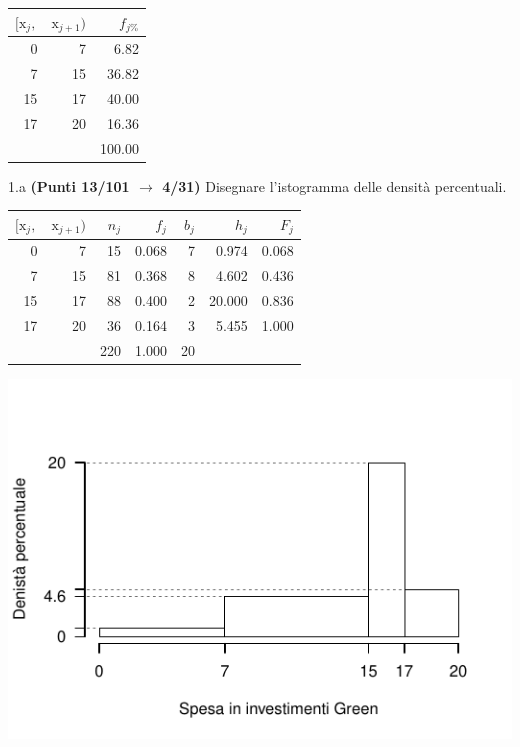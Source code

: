 \documentclass[
  11pt,
]{book}
\theoremstyle{mytheoremstyle}
\theoremstyle{mydefstyle}
\newenvironment{sol}
  {
  \begin{tcolorbox}[enhanced,breakable,arc=0.1mm,boxrule=1pt,colback=white,colframe=iblue,
  title=\bf \fontfamily{lmss}\selectfont \hspace{.5 cm} Soluzione,drop fuzzy shadow]

}{
\end{tcolorbox}
  }
\begin{document}
\begin{table}[H]
\centering
\begin{tabular}{rrr}
\toprule
$[\text{x}_j,$ & $\text{x}_{j+1})$ & $f_{j\%}$\\
\midrule
0 & 7 & 6.82\\
7 & 15 & 36.82\\
15 & 17 & 40.00\\
17 & 20 & 16.36\\
 &  & 100.00\\
\bottomrule
\end{tabular}
\end{table}

1.a \textbf{(Punti 13/101 \(\rightarrow\) 4/31)} Disegnare l'istogramma delle densità percentuali.

\begin{sol}

\begin{table}[H]
\centering
\begin{tabular}{rrrrrrr}
\toprule
$[\text{x}_j,$ & $\text{x}_{j+1})$ & $n_j$ & $f_j$ & $b_j$ & $h_j$ & $F_j$\\
\midrule
0 & 7 & 15 & 0.068 & 7 & 0.974 & 0.068\\
7 & 15 & 81 & 0.368 & 8 & 4.602 & 0.436\\
15 & 17 & 88 & 0.400 & 2 & 20.000 & 0.836\\
17 & 20 & 36 & 0.164 & 3 & 5.455 & 1.000\\
 &  & 220 & 1.000 & 20 &  & \\
\bottomrule
\end{tabular}
\end{table}

\begin{center}\includegraphics{Esami_passati_con_soluzioni_files/figure-latex/2022-56-1} \end{center}

\end{sol}
\end{document}
